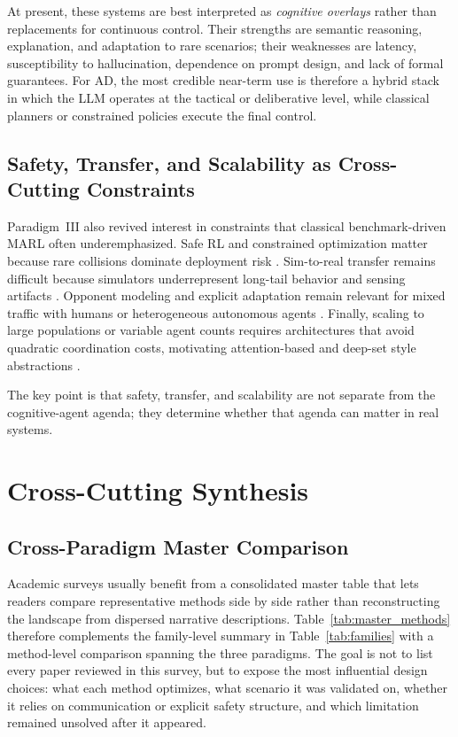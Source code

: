 \documentclass[12pt, a4paper]{article}
\begin{document}
At present, these systems are best interpreted as \emph{cognitive overlays}
rather than replacements for continuous control. Their strengths are semantic
reasoning, explanation, and adaptation to rare scenarios; their weaknesses are
latency, susceptibility to hallucination, dependence on prompt design, and lack
of formal guarantees. For AD, the most credible near-term use is therefore a
hybrid stack in which the LLM operates at the tactical or deliberative level,
while classical planners or constrained policies execute the final control.

\subsection{Safety, Transfer, and Scalability as Cross-Cutting Constraints}

Paradigm~III also revived interest in constraints that classical benchmark-driven
MARL often underemphasized. Safe RL and constrained optimization matter because
rare collisions dominate deployment risk \cite{achiam2017constrained,alshiekh2018safe,prashanth2016variance,shalev2016safe}. Sim-to-real transfer remains difficult
because simulators underrepresent long-tail behavior and sensing artifacts
\cite{tobin2017domain,finn2017model}. Opponent modeling and explicit adaptation
remain relevant for mixed traffic with humans or heterogeneous autonomous agents
\cite{he2016opponent,zhang2018fully}. Finally, scaling to large populations or
variable agent counts requires architectures that avoid quadratic coordination
costs, motivating attention-based and deep-set style abstractions
\cite{li2020deep,wen2022multi}.

The key point is that safety, transfer, and scalability are not separate from
the cognitive-agent agenda; they determine whether that agenda can matter in real
systems.

\section{Cross-Cutting Synthesis}
\label{sec:crosscut}

\subsection{Cross-Paradigm Master Comparison}

Academic surveys usually benefit from a consolidated master table that lets
readers compare representative methods side by side rather than reconstructing
the landscape from dispersed narrative descriptions. Table~\ref{tab:master_methods}
therefore complements the family-level summary in Table~\ref{tab:families} with
a method-level comparison spanning the three paradigms. The goal is not to list
every paper reviewed in this survey, but to expose the most influential design
choices: what each method optimizes, what scenario it was validated on, whether
it relies on communication or explicit safety structure, and which limitation
remained unsolved after it appeared.
\end{document}
